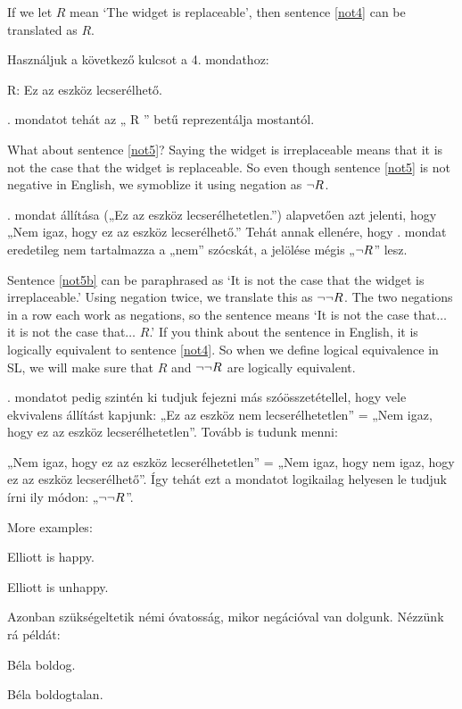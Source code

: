 If we let $R$ mean `The widget is replaceable', then sentence \ref{not4} can be translated as $R$.

Használjuk a következő kulcsot a 4. mondathoz:

\begin{ekey}
\item[R:]Ez az eszköz lecserélhető.
\end{ekey}

. mondatot tehát az „ R ” betű reprezentálja mostantól. 

What about sentence \ref{not5}? Saying the widget is irreplaceable means that it is not the case that the widget is replaceable. So even though sentence \ref{not5} is not negative in English, we symoblize it using negation as $\neg{R}$.

. mondat állítása („Ez az eszköz lecserélhetetlen.”) alapvetően azt jelenti, hogy „Nem igaz, hogy ez az eszköz lecserélhető.” Tehát annak ellenére, hogy . mondat eredetileg nem tartalmazza a „nem” szócskát, a jelölése mégis „$\neg{R}$” lesz.

Sentence \ref{not5b} can be paraphrased as `It is not the case that the widget is irreplaceable.' Using negation twice, we translate this as $\neg\neg R$. The two negations in a row each work as negations, so the sentence means `It is not the case that$\ldots$ it is not the case that$\ldots$ $R$.' If you think about the sentence in English, it is logically equivalent to sentence \ref{not4}. So when we define logical equivalence in SL, we will make sure that $R$ and $\neg\neg R$ are logically equivalent.

. mondatot pedig szintén ki tudjuk fejezni más szóösszetétellel, hogy vele ekvivalens állítást kapjunk: „Ez az eszköz nem lecserélhetetlen” = „Nem igaz, hogy ez az eszköz lecserélhetetlen”.
Tovább is tudunk menni:

„Nem igaz, hogy ez az eszköz lecserélhetetlen” = „Nem igaz, hogy nem igaz, hogy ez az eszköz lecserélhető”.  Így tehát ezt a mondatot logikailag helyesen le tudjuk írni ily módon: „$\neg\neg R$”.

More examples:
\begin{earg}
\item[\ex{not6}] Elliott is happy.
\item[\ex{not7}] Elliott is unhappy.
\end{earg}

Azonban szükségeltetik némi óvatosság, mikor negációval van dolgunk. Nézzünk rá példát:
\begin{earg}
\item[\ex{not6}] Béla boldog.
\item[\ex{not7}] Béla boldogtalan.
\end{earg}


